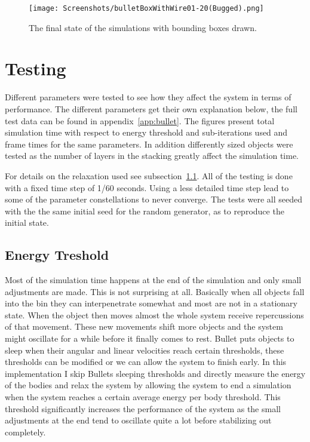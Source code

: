\begin{figure}[H]
  \centering
  \texttt{[image: Screenshots/bulletBoxWithWire01-20(Bugged).png]}
  \caption{The final state of the simulations with bounding boxes drawn.}
  \label{fig:stopStackBoxes}
\end{figure}

\section{Testing}\label{sec:testing}
Different parameters were tested to see how they affect the system in terms of performance.
The different parameters get their own explanation below, the full test data can be found in appendix~\ref{app:bullet}.
The figures present total simulation time with respect to energy threshold and sub-iterations used and
frame times for the same parameters. In addition differently sized objects were tested
as the number of layers in the stacking greatly affect the simulation time.

For details on the relaxation used see subsection~\ref{subsec:relax}.
All of the testing is done with a fixed time step of 1/60 seconds. Using a less detailed
time step lead to some of the parameter constellations to never converge.
The tests were all seeded with the the same initial seed for the random generator,
as to reproduce the initial state.

\subsection{Energy Treshold}\label{subsec:relax}
Most of the simulation time happens at the end of the simulation and only small
adjustments are made. This is not surprising at all. Basically when all objects
fall into the bin they can interpenetrate somewhat and most are not in
a stationary state. When the object then moves almost the whole system receive
repercussions of that movement. These new movements shift more objects and the
system might oscillate for a while before it finally comes to rest.
Bullet puts objects to sleep when their angular and linear velocities reach certain
thresholds, these thresholds can be modified or we can
allow the system to finish early. In this implementation I skip Bullets sleeping
thresholds and directly measure the energy of the bodies and relax the system by
allowing the system to end a simulation when the system reaches a certain
average energy per body threshold. This threshold significantly increases the performance
of the system as the small adjustments at the end tend to oscillate quite a lot before
stabilizing out completely.

